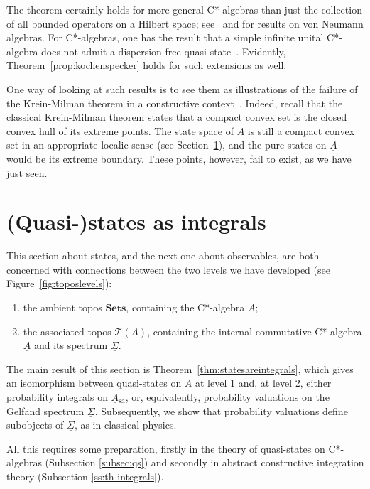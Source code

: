\documentclass[12pt]{article}
\newcommand{\ca}{C*-algebra} \newcommand{\jba}{JB-algebra}
\newcommand{\alg}[1]{\ensuremath{#1}}
\newcommand{\functor}[1]{\ensuremath{\underline{#1}}}
\newcommand{\Cat}[1]{\ensuremath{\mathrm{\textbf{#1}}}}
\newcommand{\Set}{\Cat{Sets}\xspace}
\newcommand{\asstopos}{\ensuremath{\mathcal{T}}}
\newcommand{\sa}{\ensuremath{_{\mathrm{sa}}}}
\newcommand{\uA}{\underline{A}}
\newcommand{\ulS}{\functor{\Sigma}}
\begin{document}
The  theorem certainly holds for more general C*-algebras than
just the collection of all bounded operators on a Hilbert space;
see~\cite{doering:KS} and \cite{HLSSyn} for results on von Neumann algebras.
For C*-algebras, one has the result that a simple infinite unital C*-algebra
does not admit a dispersion-free quasi-state~\cite{Hamhalter}. Evidently,
Theorem~\ref{prop:kochenspecker} holds for such extensions as well.

One way of looking at such results is to see them as
 illustrations of the failure of the Krein-Milman theorem in a constructive
context~\cite{Mulvey:Krein-Milman}. Indeed, recall that the classical
Krein-Milman
theorem states that a compact convex set is the closed convex hull of its
extreme points. The state space of $\uA$ is still a compact convex set in an
appropriate localic sense (see Section~\ref{sec:statesasintegrals}), and the
pure states on $\uA$
would be its extreme boundary. These points,
however, fail to exist, as we have just seen.
\section{(Quasi-)states as integrals}
\label{sec:statesasintegrals}
This section about states, and the next one about observables, are both
concerned with connections between
the two levels we have developed (see Figure~\ref{fig:toposlevels}):
\begin{enumerate}
  \item the ambient topos $\Set$, containing the C*-algebra
    $\alg{A}$;
  \item the associated topos $\asstopos(\alg{A})$, containing the internal
    commutative C*-algebra $\functor{\alg{A}}$ and its
    spectrum $\ulS$.
\end{enumerate}
The main result of this section is Theorem~\ref{thm:statesareintegrals}, which
gives
 an isomorphism
between quasi-states on $\alg{A}$ at level 1 and,  at level 2,  either
probability integrals on $\uA\sa$, or, equivalently, probability
valuations on the Gelfand spectrum $\ulS$.
Subsequently,  we show that probability  valuations
 define subobjects of  $\ulS$, as in classical physics.

 All this requires some preparation, firstly in the theory of quasi-states on
\ca s
 (Subsection \ref{subsec:qs}) and secondly in
 abstract constructive integration theory (Subsection \ref{ss:th-integrals}).
\end{document}
